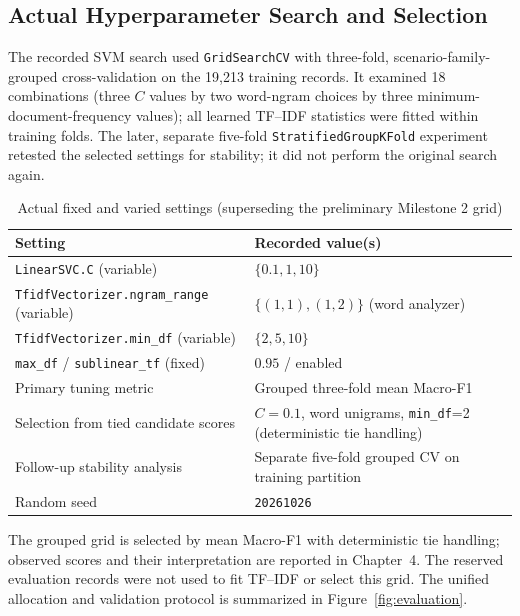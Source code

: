 \subsection{Actual Hyperparameter Search and Selection}
The recorded SVM search used \texttt{GridSearchCV} with three-fold, scenario-family-grouped cross-validation on the 19,213 training records. It examined 18 combinations (three $C$ values by two word-ngram choices by three minimum-document-frequency values); all learned TF--IDF statistics were fitted within training folds. The later, separate five-fold \texttt{StratifiedGroupKFold} experiment retested the selected settings for stability; it did not perform the original search again.
\begin{table}[H]\centering\caption{Actual fixed and varied settings (superseding the preliminary Milestone 2 grid)}\label{tab:m2grid}\small\begin{tabularx}{\textwidth}{p{}X}\toprule
Setting & Recorded value(s)\\\midrule
\texttt{LinearSVC.C} (variable) & $\{0.1,1,10\}$\\
\texttt{TfidfVectorizer.ngram\_range} (variable) & $\{(1,1),(1,2)\}$ (word analyzer)\\
\texttt{TfidfVectorizer.min\_df} (variable) & $\{2,5,10\}$\\
\texttt{max\_df} / \texttt{sublinear\_tf} (fixed) & $0.95$ / enabled\\
Primary tuning metric & Grouped three-fold mean Macro-F1\\
Selection from tied candidate scores & $C=0.1$, word unigrams, \texttt{min\_df}=2 (deterministic tie handling)\\
Follow-up stability analysis & Separate five-fold grouped CV on training partition\\
Random seed & \texttt{20261026}\\\bottomrule
\end{tabularx}\end{table}
The grouped grid is selected by mean Macro-F1 with deterministic tie handling; observed scores and their interpretation are reported in Chapter~4. The reserved evaluation records were not used to fit TF--IDF or select this grid. The unified allocation and validation protocol is summarized in Figure~\ref{fig:evaluation}.

